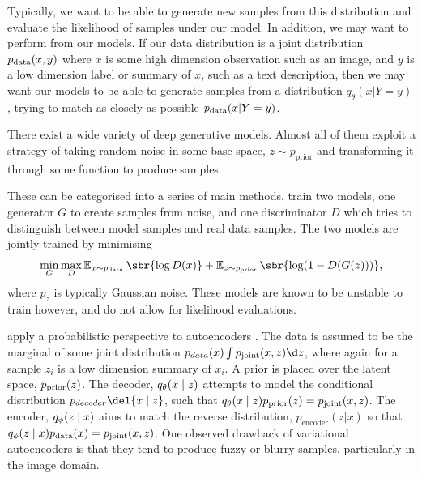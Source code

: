 Typically, we want to be able to generate new samples from this distribution and evaluate the likelihood of samples under our model.
In addition, we may want to perform  from our models.
If our data distribution is a joint distribution \(p_{\text{data}}(x, y)\) where \(x\) is some high dimension observation such as an image, and \(y\) is a low dimension label or summary of \(x\), such as a text description, then we may want our models to be able to generate samples from a distribution \(q_\theta(x | Y=y)\), trying to match as closely as possible \(p_{\text{data}}(x | Y=y)\).

There exist a wide variety of deep generative models.
Almost all of them exploit a strategy of taking random noise in some base space, \(z\sim p_{\text{prior}}\) and transforming it through some function to produce samples.

These can be categorised into a series of main methods.
 \cite{goodfellow2014generative} train two models, one generator \(G\) to create samples from noise, and one discriminator \(D\) which tries to distinguish between model samples and real data samples. 
The two models are jointly trained by minimising 
\[
	\min_G \max_D \E_{x\sim \pdata} \sbr{\log D(x)} + \E_{z\sim p_{\text{prior}}} \sbr{\log(1- D(G(z)))},
\]
where \(p_z\) is typically Gaussian noise.
These models are known to be unstable to train \cite{wiatrak2019stabilizing} however, and do not allow for likelihood evaluations.

 \cite{kingma2013auto,rezende2014stochastic} apply a probabilistic perspective to autoencoders \cite{rumelhart1986learning}.
The data is assumed to be the marginal of some joint distribution \(p_{data}(x) \int p_{\text{joint}} (x, z) \d z\), where again for a sample \(z_i\) is a low dimension summary of \(x_i\).
A prior is placed over the latent space, \(p_{\text{prior}}(z)\).
The decoder, \(q_\theta(x \mid z)\) attempts to model the conditional distribution \(p_{decoder}\del{x \given z}\), such that \(q_\theta(x \mid z) p_{\text{prior}} (z) = p_{\text{joint}}(x, z)\).
The encoder, \(q_\phi(z \mid x)\) aims to match the reverse distribution, \(p_{\text{encoder}}(z | x)\) so that \(q_\phi(z \mid x) p_{\text{data}} (x) = p_{\text{joint}}(x, z)\).
One observed drawback of variational autoencoders is that they tend to produce fuzzy or blurry samples, particularly in the image domain.

